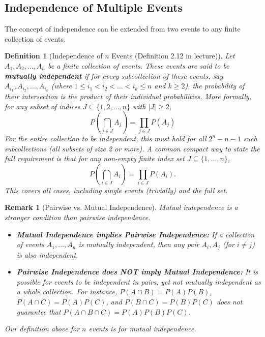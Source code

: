 \documentclass[11pt]{article}
\newtheorem{definition}[theorem]{Definition}
\newtheorem{remark}[theorem]{Remark}
\begin{document}
\subsection{Independence of Multiple Events}
The concept of independence can be extended from two events to any finite collection of events.

\begin{definition}[Independence of $n$ Events (Definition 2.12 in lecture)]
Let $A_1, A_2, \dots, A_n$ be a finite collection of events. These events are said to be \textbf{mutually independent} if for every subcollection of these events, say $A_{i_1}, A_{i_2}, \dots, A_{i_k}$ (where $1 \le i_1 < i_2 < \dots < i_k \le n$ and $k \ge 2$), the probability of their intersection is the product of their individual probabilities.
More formally, for any subset of indices $J \subseteq \{1, 2, \dots, n\}$ with $|J| \ge 2$,
\begin{equation}
P\left(\bigcap_{j \in J} A_j\right) = \prod_{j \in J} P(A_j)
\end{equation}
For the entire collection to be independent, this must hold for all $2^n - n - 1$ such subcollections (all subsets of size 2 or more). A common compact way to state the full requirement is that for \textit{any} non-empty finite index set $J \subseteq \{1, \dots, n\}$,
\begin{equation}
P\left(\bigcap_{i \in J} A_i\right) = \prod_{i \in J} P(A_i).
\end{equation}
This covers all cases, including single events (trivially) and the full set.
\end{definition}

\begin{remark}[Pairwise vs. Mutual Independence]
Mutual independence is a stronger condition than pairwise independence.
\begin{itemize}
    \item \textbf{Mutual Independence implies Pairwise Independence:} If a collection of events $A_1, \dots, A_n$ is mutually independent, then any pair $A_i, A_j$ (for $i \neq j$) is also independent.
    \item \textbf{Pairwise Independence does NOT imply Mutual Independence:} It is possible for events to be independent in pairs, yet not mutually independent as a whole collection. For instance, $P(A \cap B) = P(A)P(B)$, $P(A \cap C) = P(A)P(C)$, and $P(B \cap C) = P(B)P(C)$ does not guarantee that $P(A \cap B \cap C) = P(A)P(B)P(C)$.
\end{itemize}
Our definition above for $n$ events is for mutual independence.
\end{remark}
\end{document}
